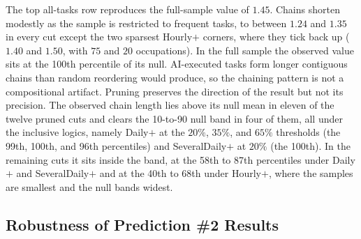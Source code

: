 The top all-tasks row reproduces the full-sample value of $1.45$.
Chains shorten modestly as the sample is restricted to frequent tasks, to between $1.24$ and $1.35$ in every cut except the two sparsest Hourly$+$ corners, where they tick back up ($1.40$ and $1.50$, with $75$ and $20$ occupations).
In the full sample the observed value sits at the 100th percentile of its null. AI-executed tasks form longer contiguous chains than random reordering would produce, so the chaining pattern is not a compositional artifact.
Pruning preserves the direction of the result but not its precision.
The observed chain length lies above its null mean in eleven of the twelve pruned cuts and clears the 10-to-90 null band in four of them, all under the inclusive logics, namely Daily$+$ at the $20\%$, $35\%$, and $65\%$ thresholds (the 99th, 100th, and 96th percentiles) and SeveralDaily$+$ at $20\%$ (the 100th).
In the remaining cuts it sits inside the band, at the 58th to 87th percentiles under Daily$+$ and SeveralDaily$+$ and at the 40th to 68th under Hourly$+$, where the samples are smallest and the null bands widest.



\subsection{Robustness of Prediction \#2 Results}
\label{app:frequency_robustness_neighbor}


